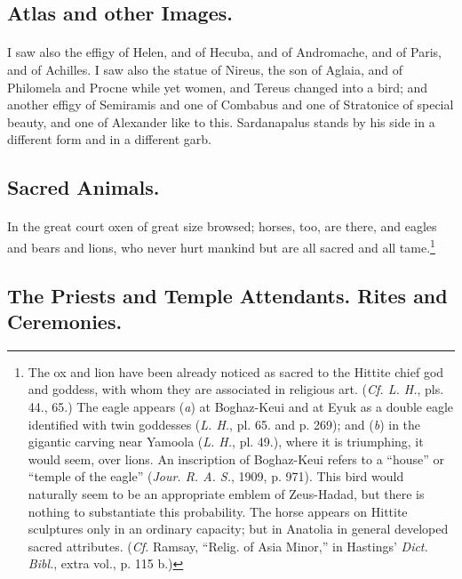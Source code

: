 \documentclass[a4paper, 11pt, oneside, polutonikogreek, english]{article}
\begin{document}
\subsection{Atlas and other Images.}
\paragraph{}
I saw also the effigy of Helen, and of Hecuba, and of Andromache, and of Paris, and of Achilles. I saw also the statue of Nireus, the son of Aglaia, and of Philomela and Procne while yet women, and Tereus changed into a bird; and another effigy of Semiramis and one of Combabus and one of Stratonice of special beauty, and one of Alexander like to this. Sardanapalus stands by his side in a different form and in a different garb.

\subsection{Sacred Animals.}
\paragraph{}
In the great court oxen of great size browsed; horses, too, are there, and eagles and bears and lions, who never hurt mankind but are all sacred and all tame.\footnote{The ox and lion have been already noticed as sacred to the Hittite chief god and goddess, with whom they are associated in religious art. (\emph{Cf. L. H.}, pls. 44., 65.) The eagle appears (\emph{a}) at Boghaz-Keui and at Eyuk as a double eagle identified with twin goddesses (\emph{L. H.}, pl. 65. and p. 269); and (\emph{b}) in the gigantic carving near Yamoola (\emph{L. H.}, pl. 49.), where it is triumphing, it would seem, over lions. An inscription of Boghaz-Keui refers to a ``house'' or ``temple of the eagle'' (\emph{Jour. R. A. S.}, 1909, p. 971). This bird would naturally seem to be an appropriate emblem of Zeus-Hadad, but there is nothing to substantiate this probability. The horse appears on Hittite sculptures only in an ordinary capacity; but in Anatolia in general developed sacred attributes. (\emph{Cf.} Ramsay, ``Relig. of Asia Minor,'' in Hastings' \emph{Dict. Bibl.}, extra vol., p. 115 b.)}

\subsection{The Priests and Temple Attendants. Rites and Ceremonies.}
\end{document}
